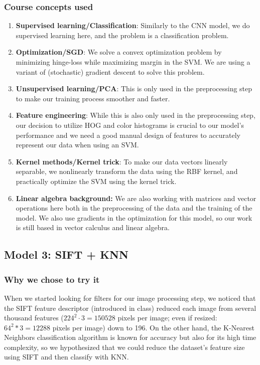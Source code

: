 \documentclass[10pt]{article} %
\begin{document}
\subsubsection{Course concepts used}
\begin{enumerate}
  \item \textbf{Supervised learning/Classification}: Similarly to the CNN model, we do supervised learning here, and the problem is a classification problem.
  \item \textbf{Optimization/SGD}: We solve a convex optimization problem by minimizing hinge-loss while maximizing margin in the SVM. We are using a variant of (stochastic) gradient descent to solve this problem.
  \item \textbf{Unsupervised learning/PCA}: This is only used in the preprocessing step to make our training process smoother and faster.
  \item \textbf{Feature engineering}: While this is also only used in the preprocessing step, our decision to utilize HOG and color histograms is crucial to our model's performance and we need a good manual design of features to accurately represent our data when using an SVM.
  \item \textbf{Kernel methods/Kernel trick}: To make our data vectors linearly separable, we nonlinearly transform the data using the RBF kernel, and practically optimize the SVM using the kernel trick.
  \item \textbf{Linear algebra background:} We are also working with matrices and vector operations here both in the preprocessing of the data and the training of the model. We also use gradients in the optimization for this model, so our work is still based in vector calculus and linear algebra.
\end{enumerate}
\subsection{Model 3: SIFT + KNN}
\subsubsection{Why we chose to try it}
When we started looking for filters for our image processing step, we noticed that the SIFT feature descriptor (introduced in class) reduced each image from several thousand features (\(224^2 \cdot 3 = 150528\) pixels per image; even if resized: \(64^2*3 = 12288\) pixels per image) down to 196. On the other hand, the K-Nearest Neighbors classification algorithm is known for accuracy but also for its high time complexity, so we hypothesized that we could reduce the dataset's feature size using SIFT and then classify with KNN.
\end{document}
